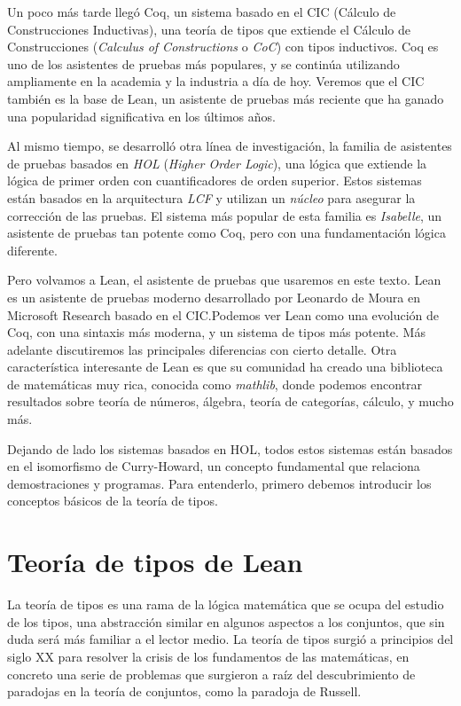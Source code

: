 \documentclass[
  a4paper, 
  10pt, 
  parskip=half, 
  toc=bibliography,
]{scrbook}
\makeatletter
\theoremstyle{definition}
\theoremstyle{bolddef}
\renewcommand\mainmatter{
    \@mainmattertrue\cleardoublepage\renewcommand\thepage{\arabic{page}}}
\makeatother
\begin{document}
Un poco más tarde llegó Coq, un sistema basado en el CIC (Cálculo de Construcciones
Inductivas), una teoría de tipos que extiende el Cálculo de Construcciones 
(\emph{Calculus of Constructions} o \emph{CoC}) con tipos inductivos. Coq es uno de los
asistentes de pruebas más populares, y se continúa utilizando ampliamente en la academia y
la industria a día de hoy. Veremos que el CIC también es la base de Lean, un
asistente de pruebas más reciente que ha ganado una popularidad significativa en
los últimos años.

Al mismo tiempo, se desarrolló otra línea de investigación, la familia de
asistentes de pruebas basados en \emph{HOL} (\emph{Higher Order Logic}), una lógica que
extiende la lógica de primer orden con cuantificadores de orden superior. Estos
sistemas están basados en la arquitectura \emph{LCF} y utilizan un \emph{núcleo} para
asegurar la corrección de las pruebas. El sistema más popular de esta familia es
\emph{Isabelle}, un asistente de pruebas tan potente como Coq, pero con una
fundamentación lógica diferente. 

Pero volvamos a Lean, el asistente de pruebas que usaremos en este texto. Lean
es un asistente de pruebas moderno desarrollado por Leonardo de Moura en Microsoft
Research basado en el CIC.\@ Podemos ver Lean como una evolución de Coq, con una
sintaxis más moderna, y un sistema de tipos más potente. Más adelante discutiremos
las principales diferencias con cierto detalle. Otra característica interesante de Lean es que 
su comunidad ha creado una biblioteca de matemáticas muy rica, conocida como \emph{mathlib}, 
donde podemos encontrar resultados sobre teoría de números, álgebra, teoría de
categorías, cálculo, y mucho más.

Dejando de lado los sistemas basados en HOL, todos estos sistemas están basados en el
isomorfismo de Curry-Howard, un concepto fundamental que relaciona demostraciones
y programas. Para entenderlo, primero debemos introducir los conceptos básicos de
la teoría de tipos.

\mainmatter{}

\chapter{Teoría de tipos de Lean}

La teoría de tipos es una rama de la lógica matemática que se ocupa del estudio
de los tipos, una abstracción similar en algunos aspectos a los conjuntos, que 
sin duda será más familiar a el lector medio. La teoría de tipos surgió a principios del siglo XX
para resolver la crisis de los fundamentos de las matemáticas, en concreto una serie de
problemas que surgieron a raíz del descubrimiento de paradojas en la teoría de
conjuntos, como la paradoja de Russell.
\end{document}
